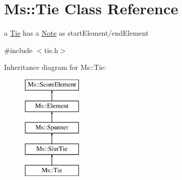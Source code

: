\hypertarget{class_ms_1_1_tie}{}\section{Ms\+:\+:Tie Class Reference}
\label{class_ms_1_1_tie}


a \hyperlink{class_ms_1_1_tie}{Tie} has a \hyperlink{class_ms_1_1_note}{Note} as start\+Element/end\+Element  




{\ttfamily \#include $<$tie.\+h$>$}

Inheritance diagram for Ms\+:\+:Tie\+:\begin{figure}[H]
\begin{center}
\leavevmode
\includegraphics[height=5.000000cm]{class_ms_1_1_tie}
\end{center}
\end{figure}
